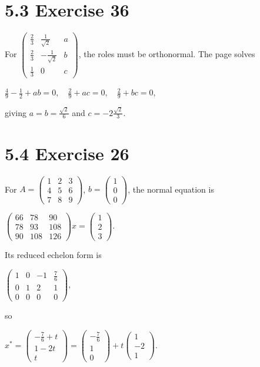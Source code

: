 \section{5.3 Exercise 36}

For \(\begin{pmatrix}
\frac{2}{3} & \frac{1}{\sqrt{2}} & a \\
\frac{2}{3} & {- \frac{1}{\sqrt{2}}} & b \\
\frac{1}{3} & 0 & c
\end{pmatrix}\), the roles must be orthonormal. The page solves

\(\frac{4}{9} - \frac{1}{2} + ab = 0,\quad\frac{2}{9} + ac = 0,\quad\frac{2}{9} + bc = 0,\)

giving \(a = b = \frac{\sqrt{2}}{6}\) and \(c = - 2\frac{\sqrt{2}}{3}\).

\section{5.4 Exercise 26}

For \(A = \begin{pmatrix}
1 & 2 & 3 \\
4 & 5 & 6 \\
7 & 8 & 9
\end{pmatrix}\), \(b = \begin{pmatrix}
1 \\
0 \\
0
\end{pmatrix}\), the normal equation is

\(\begin{pmatrix}
66 & 78 & 90 \\
78 & 93 & 108 \\
90 & 108 & 126
\end{pmatrix}x = \begin{pmatrix}
1 \\
2 \\
3
\end{pmatrix}.\)

Its reduced echelon form is

\(\begin{pmatrix}
1 & 0 & {- 1} & \frac{7}{6} \\
0 & 1 & 2 & 1 \\
0 & 0 & 0 & 0
\end{pmatrix},\)

so

\(x^{\ast} = \begin{pmatrix}
{- \frac{7}{6} + t} \\
{1 - 2t} \\
t
\end{pmatrix} = \begin{pmatrix}
{- \frac{7}{6}} \\
1 \\
0
\end{pmatrix} + t\begin{pmatrix}
1 \\
{- 2} \\
1
\end{pmatrix}.\)

